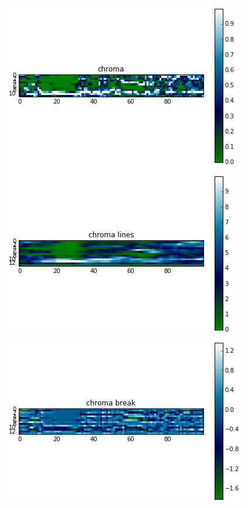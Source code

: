 \documentclass{article}
\begin{document}
\begin{figure}[H]
    \centering
    
    \begin{minipage}[b]{0.3\textwidth}
        \includegraphics[width=\textwidth]{chroma-bare.png}
    \end{minipage}
    \hfill
    \begin{minipage}[b]{0.3\textwidth}
        \includegraphics[width=\textwidth]{chroma-lines.png}
    \end{minipage}
    \hfill
    \begin{minipage}[b]{0.3\textwidth}
        \includegraphics[width=\textwidth]{chromc-line-end-.png}

\end{minipage}
\end{figure}
\end{document}
